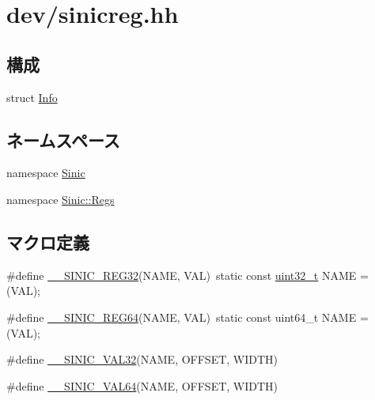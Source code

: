 \hypertarget{sinicreg_8hh}{
\section{dev/sinicreg.hh}
\label{sinicreg_8hh}
}
\subsection*{構成}
\begin{DoxyCompactItemize}
\item 
struct \hyperlink{structSinic_1_1Regs_1_1Info}{Info}
\end{DoxyCompactItemize}
\subsection*{ネームスペース}
\begin{DoxyCompactItemize}
\item 
namespace \hyperlink{namespaceSinic}{Sinic}
\item 
namespace \hyperlink{namespaceSinic_1_1Regs}{Sinic::Regs}
\end{DoxyCompactItemize}
\subsection*{マクロ定義}
\begin{DoxyCompactItemize}
\item 
\#define \hyperlink{sinicreg_8hh_aa11dfb860e2debd2029da85ba29bdf94}{\_\-\_\-SINIC\_\-REG32}(NAME, VAL)~static const \hyperlink{Type_8hh_a435d1572bf3f880d55459d9805097f62}{uint32\_\-t} NAME = (VAL);
\item 
\#define \hyperlink{sinicreg_8hh_a4c4205d0815375c92d8c1e275159b3b0}{\_\-\_\-SINIC\_\-REG64}(NAME, VAL)~static const uint64\_\-t NAME = (VAL);
\item 
\#define \hyperlink{sinicreg_8hh_a1d2f3376fdf5ddbfaeceb608e2f04906}{\_\-\_\-SINIC\_\-VAL32}(NAME, OFFSET, WIDTH)
\item 
\#define \hyperlink{sinicreg_8hh_ab6ae16561ac71ad7de115787fd394586}{\_\-\_\-SINIC\_\-VAL64}(NAME, OFFSET, WIDTH)
\end{DoxyCompactItemize}
